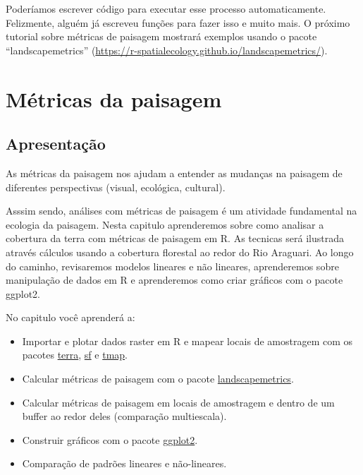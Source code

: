 \documentclass[
]{article}
\begin{document}
Poderíamos escrever código para executar esse processo automaticamente. Felizmente, alguém já escreveu funções para fazer isso e muito mais. O próximo tutorial sobre métricas de paisagem mostrará exemplos usando o pacote ``landscapemetrics'' (\url{https://r-spatialecology.github.io/landscapemetrics/}).

\newpage{}

\hypertarget{muxe9tricas-da-paisagem}{%
\section{Métricas da paisagem}\label{muxe9tricas-da-paisagem}}

\hypertarget{apresentauxe7uxe3o-1}{%
\subsection{Apresentação}\label{apresentauxe7uxe3o-1}}

As métricas da paisagem nos ajudam a entender as mudanças na paisagem de diferentes perspectivas (visual, ecológica, cultural).

Asssim sendo, análises com métricas de paisagem é um atividade fundamental na ecologia da paisagem. Nesta capitulo aprenderemos sobre como analisar a cobertura da terra com métricas de paisagem em R. As tecnicas será ilustrada através cálculos usando a cobertura florestal ao redor do Rio Araguari. Ao longo do caminho, revisaremos modelos lineares e não lineares, aprenderemos sobre manipulação de dados em R e aprenderemos como criar gráficos com o pacote ggplot2.

No capitulo você aprenderá a:

\begin{itemize}
\item
  Importar e plotar dados raster em R e mapear locais de amostragem com os pacotes \href{https://rspatial.org/pkg/index.html}{terra}, \href{https://cran.r-project.org/web/packages/sf/vignettes/sf1.html}{sf} e \href{https://r-tmap.github.io/tmap/}{tmap}.
\item
  Calcular métricas de paisagem com o pacote \href{https://r-spatialecology.github.io/landscapemetrics/}{landscapemetrics}.
\item
  Calcular métricas de paisagem em locais de amostragem e dentro de um buffer ao redor deles (comparação multiescala).
\item
  Construir gráficos com o pacote \href{https://ggplot2.tidyverse.org/}{ggplot2}.
\item
  Comparação de padrões lineares e não-lineares.
\end{itemize}
\end{document}
